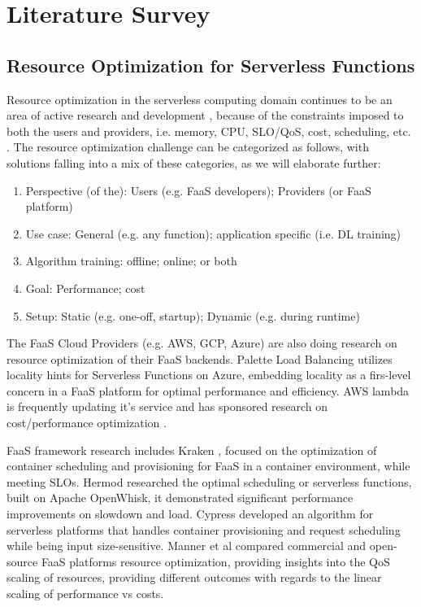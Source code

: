 \documentclass[conference]{IEEEtran}
\begin{document}
\section{Literature Survey}
\subsection{Resource Optimization for Serverless Functions}
Resource optimization in the serverless computing domain continues to be an area of active research and development \cite{10.1145/3587249, 10.1145/3406011, 9756233}, because of the constraints imposed to both the users and providers, i.e. memory, CPU, SLO/QoS, cost, scheduling, etc. \cite{10181224, 10.1145/3542929.3563469, 9860980, 9460548, 10.1145/3429880.3430099}. The resource optimization challenge can be categorized as follows, with solutions falling into a mix of these categories, as we will elaborate further:

\begin{enumerate}
    \item Perspective (of the): Users (e.g. FaaS developers); Providers (or FaaS platform)
    \item Use case: General (e.g. any function); application specific (i.e. DL training)
    \item Algorithm training: offline; online; or both
    \item Goal: Performance; cost
    \item Setup: Static (e.g. one-off, startup); Dynamic (e.g. during runtime)
\end{enumerate}

The FaaS Cloud Providers (e.g. AWS, GCP, Azure) are also doing research on resource optimization of their FaaS backends. Palette Load Balancing \cite{10.1145/3552326.3567496} utilizes locality hints for Serverless Functions on Azure, embedding locality as a firs-level concern in a FaaS platform for optimal performance and efficiency. AWS lambda is frequently updating it's service \cite{aws_new} and has sponsored research on cost/performance optimization \cite{aws_operating_lambda_performance_optimization}.

FaaS framework research includes Kraken \cite{10.1145/3472883.3486992}, focused on the optimization of container scheduling and provisioning for FaaS in a container environment, while meeting SLOs. Hermod \cite{10.1145/3542929.3563468} researched the optimal scheduling or serverless functions, built on Apache OpenWhisk, it demonstrated significant performance improvements on slowdown and load. Cypress \cite{10.1145/3542929.3563464} developed an algorithm for serverless platforms that handles container provisioning and request scheduling while being input size-sensitive. Manner et al \cite{9860370} compared commercial and open-source FaaS platforms resource optimization, providing insights into the QoS scaling of resources, providing different outcomes with regards to the linear scaling of performance vs costs.
\end{document}
